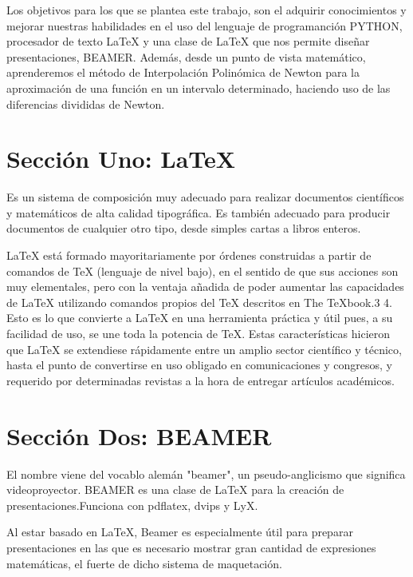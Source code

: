 
Los objetivos para los que se plantea este trabajo, son el adquirir conocimientos y mejorar nuestras habilidades en el uso del lenguaje de programanción PYTHON, procesador de texto \LaTeX{} y una clase de \LaTeX{} que nos permite diseñar presentaciones, BEAMER. Además, desde un punto de vista matemático, aprenderemos el método de Interpolación Polinómica de Newton para la aproximación de una función en un intervalo determinado, haciendo uso de las diferencias divididas de Newton.
\section{Sección Uno: \LaTeX}
\label{1:sec:1}
 Es un sistema de composición muy adecuado para realizar documentos científicos y matemáticos de alta calidad tipográfica. Es también adecuado para producir documentos de cualquier otro tipo, desde simples cartas a libros enteros.\par\LaTeX{} está formado mayoritariamente por órdenes construidas a partir de comandos de \TeX{} (lenguaje de nivel bajo), en el sentido de que sus acciones son muy elementales, pero con la ventaja añadida de poder aumentar las capacidades de \LaTeX{} utilizando comandos propios del \TeX{} descritos en The TeXbook.3 4. Esto es lo que convierte a \LaTeX{} en una herramienta práctica y útil pues, a su facilidad de uso, se une toda la potencia de \TeX{}. Estas características hicieron que \LaTeX{} se extendiese rápidamente entre un amplio sector científico y técnico, hasta el punto de convertirse en uso obligado en comunicaciones y congresos, y requerido por determinadas revistas a la hora de entregar artículos académicos.
\section{Sección Dos: BEAMER}
\label{1:sec:2}
El nombre viene del vocablo alemán "beamer", un pseudo-anglicismo que significa videoproyector. BEAMER es una clase de \LaTeX{} para la creación de presentaciones.Funciona con pdflatex, dvips y LyX.\par Al estar basado en LaTeX, Beamer es especialmente útil para preparar presentaciones en las que es necesario mostrar gran cantidad de expresiones matemáticas, el fuerte de dicho sistema de maquetación.
